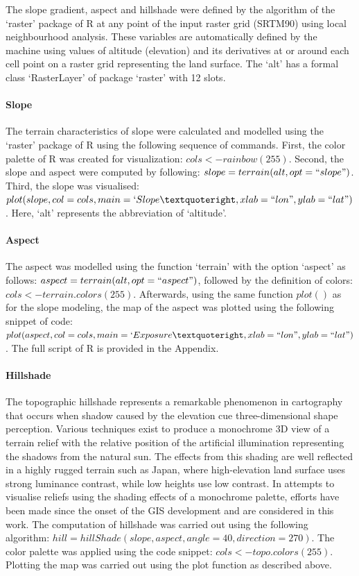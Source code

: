 \documentclass[land,article,accept,pdftex,moreauthors]{Definitions/mdpi}
\begin{document}
The slope gradient, aspect and hillshade were defined by the algorithm of the ‘raster’ package of R at any point of the input raster grid (SRTM90) using local neighbourhood analysis. These variables are automatically defined by the machine using values of altitude (elevation) and its derivatives at or around each cell point on a raster grid representing the land surface. The ‘alt’ has a formal class `RasterLayer' of package ‘raster’ with 12 slots.

\paragraph{Slope}
The terrain characteristics of slope were calculated and modelled using the ‘raster’ package of R using the following sequence of commands. First, the color palette of R was created for visualization: $cols <- rainbow(255)$. Second, the slope and aspect were computed by following: $slope = terrain(alt, opt = ``slope")$. Third, the slope was visualised: $plot(slope, col=cols, main= `Slope’, xlab = ``lon", ylab = ``lat")$. Here, ‘alt’ represents the abbreviation of ‘altitude’.

\paragraph{Aspect}
The aspect was modelled using the function ‘terrain’ with the option ‘aspect’ as follows: $aspect = terrain(alt, opt = ``aspect")$, followed by the definition of colors: $cols <- terrain.colors(255)$. Afterwards, using the same function $plot()$ as for the slope modeling, the map of the aspect was plotted using the following snippet of code: $plot(aspect, col=cols, main = `Exposure’, xlab = ``lon", ylab = ``lat")$. The full script of R is provided in the Appendix.
 
 \paragraph{Hillshade} 
The topographic hillshade represents a remarkable phenomenon in cartography that occurs when shadow caused by the elevation cue three-dimensional shape perception. Various techniques exist to produce a monochrome 3D view of a terrain relief with the relative position of the artificial illumination representing the shadows from the natural sun. The effects from this shading are well reflected in a highly rugged terrain such as Japan, where high-elevation land surface uses strong luminance contrast, while low heights use low contrast. In attempts to visualise reliefs using the shading effects of a monochrome palette, efforts have been made since the onset of the GIS development and are considered in this work. The computation of hillshade was carried out using the following algorithm: $hill = hillShade(slope, aspect, angle = 40, direction = 270)$. The color palette was applied using the code snippet: $cols <- topo.colors(255)$. Plotting the map was carried out using the plot function as described above.
 
\end{document}

